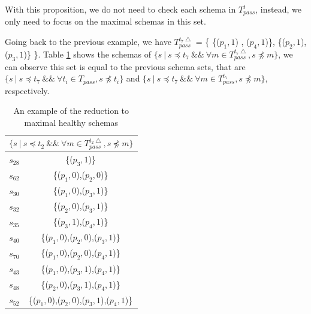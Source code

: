 With this proposition, we do not need to check each schema in $T_{pass}^{t}$, instead, we only need to focus on the maximal schemas in this set.


Going back to the previous example, we have $T_{pass}^{t_{7}\bigtriangleup}$ = \{ \{($p_{1}, 1$) , ($p_{4}, 1$)\}, \{($p_{2}, 1$), ($p_{3}, 1$)\} \}. Table \ref{ex:maximalhealthyintequal} shows the schemas of $\{ s\ |\ s \preceq t_{7}\ \&\&\ \forall m \in T_{pass}^{t_{7}\bigtriangleup}, s \npreceq m \}$, we can observe this set is equal to the previous schema sets, that are  $\{ s\ |\ s \preceq t_{7}\ \&\&\  \forall t_{i} \in T_{pass}, s \npreceq t_{i} \} $ and $\{ s\ |\ s \preceq t_{7}\ \&\&\ \forall m \in T_{pass}^{t_{7}}, s \npreceq m \}$, respectively.


 \begin{table}[htbp]
  \centering
  \caption{An example of the reduction to maximal healthy schemas}
  \label{ex:maximalhealthyintequal}
    \begin{tabular}{|c|c|} \hline
     \multicolumn{2}{|c|}{$\{ s\ |\ s \preceq t_{2}\ \&\&\ \forall m \in T_{pass}^{t_{2}\bigtriangleup}, s \npreceq m \}$} \\ \hline
   $s_{28}$ & \{($p_{3}, 1$)\} \\
   $s_{62}$ & \{($p_{1}, 0$),($p_{2}, 0$)\} \\
   $s_{30}$ & \{($p_{1}, 0$),($p_{3}, 1$)\} \\
   $s_{32}$ & \{($p_{2}, 0$),($p_{3}, 1$)\} \\
   $s_{35}$ & \{($p_{3}, 1$),($p_{4}, 1$)\} \\
   $s_{40}$ & \{($p_{1}, 0$),($p_{2}, 0$),($p_{3}, 1$)\} \\
   $s_{70}$ & \{($p_{1}, 0$),($p_{2}, 0$),($p_{4}, 1$)\} \\
   $s_{43}$ & \{($p_{1}, 0$),($p_{3}, 1$),($p_{4}, 1$)\} \\
   $s_{48}$ & \{($p_{2}, 0$),($p_{3}, 1$),($p_{4}, 1$)\} \\
   $s_{52}$ & \{($p_{1}, 0$),($p_{2}, 0$),($p_{3}, 1$),($p_{4}, 1$)\} \\ \hline
    \end{tabular}%
  \end{table}



